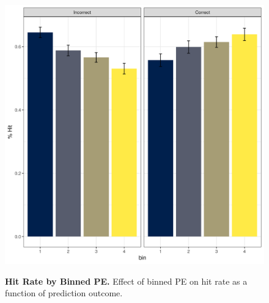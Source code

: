 \documentclass[a4paper,12pt]{article} 			%
\begin{document}
\begin{figure}[ht!]
{\includegraphics[width=1\textwidth]{figures/binnedPE_mem.png}}
\caption{\textbf{Hit Rate by Binned PE.} Effect of binned PE on hit rate as a function of prediction outcome. }
\label{fig:PEbin_mem}

\end{figure}
\end{document}
